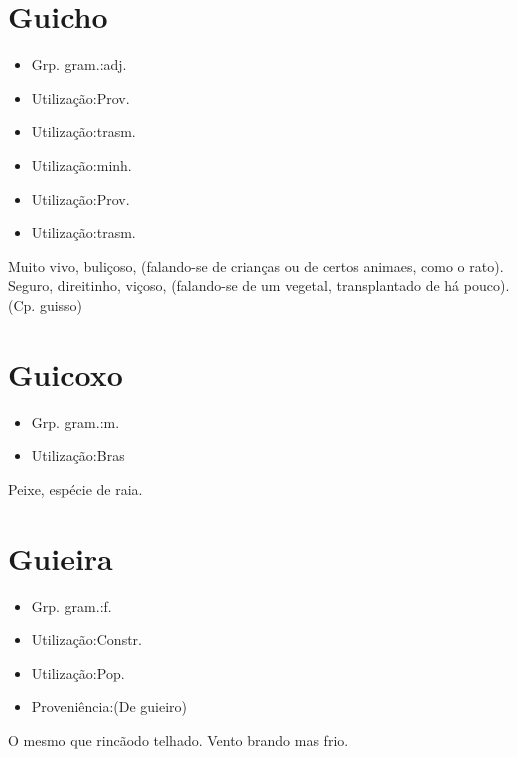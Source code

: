 \section{Guicho}
\begin{itemize}
\item {Grp. gram.:adj.}
\end{itemize}
\begin{itemize}
\item {Utilização:Prov.}
\end{itemize}
\begin{itemize}
\item {Utilização:trasm.}
\end{itemize}
\begin{itemize}
\item {Utilização:minh.}
\end{itemize}
\begin{itemize}
\item {Utilização:Prov.}
\end{itemize}
\begin{itemize}
\item {Utilização:trasm.}
\end{itemize}
Muito vivo, buliçoso, (falando-se de crianças ou de certos animaes, como o rato).
Seguro, direitinho, viçoso, (falando-se de um vegetal, transplantado de há pouco).
(Cp. \textunderscore guisso\textunderscore )
\section{Guicoxo}
\begin{itemize}
\item {Grp. gram.:m.}
\end{itemize}
\begin{itemize}
\item {Utilização:Bras}
\end{itemize}
Peixe, espécie de raia.
\section{Guieira}
\begin{itemize}
\item {Grp. gram.:f.}
\end{itemize}
\begin{itemize}
\item {Utilização:Constr.}
\end{itemize}
\begin{itemize}
\item {Utilização:Pop.}
\end{itemize}
\begin{itemize}
\item {Proveniência:(De \textunderscore guieiro\textunderscore )}
\end{itemize}
O mesmo que \textunderscore rincão\textunderscore  do telhado.
Vento brando mas frio.
